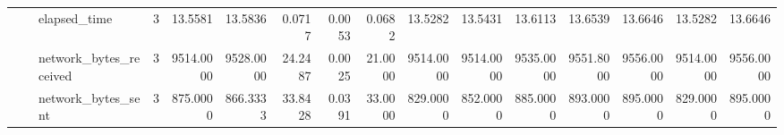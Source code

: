 \begin{tabular}{lllrrrrrrrrrrrrr}
 &  & elapsed\_time & 3 & 13.5581 & 13.5836 & 0.0717 & 0.0053 & 0.0682 & 13.5282 & 13.5431 & 13.6113 & 13.6539 & 13.6646 & 13.5282 & 13.6646 \\
 &  & network\_bytes\_received & 3 & 9514.0000 & 9528.0000 & 24.2487 & 0.0025 & 21.0000 & 9514.0000 & 9514.0000 & 9535.0000 & 9551.8000 & 9556.0000 & 9514.0000 & 9556.0000 \\
 &  & network\_bytes\_sent & 3 & 875.0000 & 866.3333 & 33.8428 & 0.0391 & 33.0000 & 829.0000 & 852.0000 & 885.0000 & 893.0000 & 895.0000 & 829.0000 & 895.0000 \\
\cline{1-16} \cline{2-16}
\bottomrule
\end{tabular}
